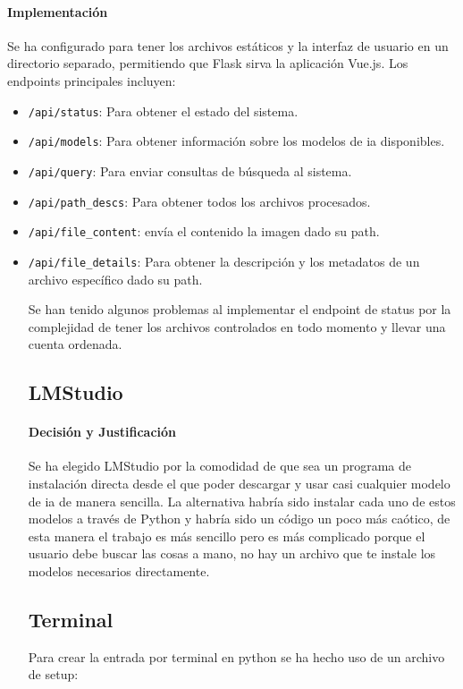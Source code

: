 \paragraph{Implementación}
Se ha configurado para tener los archivos estáticos y la interfaz de usuario en un directorio separado, permitiendo que Flask sirva la aplicación Vue.js. Los endpoints principales incluyen:
\begin{itemize}
    \item \texttt{/api/status}: Para obtener el estado del sistema.
    \item \texttt{/api/models}: Para obtener información sobre los modelos de \gls{ia} disponibles.
    \item \texttt{/api/query}: Para enviar consultas de búsqueda al sistema.
    \item \texttt{/api/path\_descs}: Para obtener todos los archivos procesados.
    \item \texttt{/api/file\_content}: envía el contenido la imagen dado su path.
    \item \texttt{/api/file\_details}: Para obtener la descripción y los metadatos de un archivo específico dado su path.

Se han tenido algunos problemas al implementar el endpoint de status por la complejidad de tener los archivos controlados en todo momento y llevar una cuenta ordenada.

\subsection{LMStudio}
\label{subsec:decision_lmstudio}
\paragraph{Decisión y Justificación}
Se ha elegido LMStudio por la comodidad de que sea un programa de instalación directa desde el que poder descargar y usar casi cualquier modelo de \gls{ia} de manera sencilla. La alternativa habría sido instalar cada uno de estos modelos a través de Python y habría sido un código un poco más caótico, de esta manera el trabajo es más sencillo pero es más complicado porque el usuario debe buscar las cosas a mano, no hay un archivo que te instale los modelos necesarios directamente.

\subsection{Terminal}
\label{subsec:decision_terminal}
Para crear la entrada por terminal en python se ha hecho uso de un archivo de setup:


\end{itemize}
